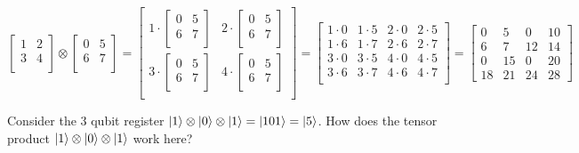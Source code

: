 \documentclass[11pt, oneside]{article}   	%
\begin{document}
\begin{equation*}
 \begin{bmatrix}
    1 & 2 \\
    3 & 4 \\
  \end{bmatrix}
\otimes
 \begin{bmatrix}
    0 & 5 \\
    6 & 7 \\
  \end{bmatrix} =
  \begin{bmatrix}
    1 \cdot \begin{bmatrix}
      0 & 5 \\
      6 & 7 \\
    \end{bmatrix} & 
    2 \cdot \begin{bmatrix}
      0 & 5 \\
      6 & 7 \\
    \end{bmatrix} \\

    3 \cdot \begin{bmatrix}
      0 & 5 \\
      6 & 7 \\
    \end{bmatrix} & 
    4 \cdot \begin{bmatrix}
      0 & 5 \\
      6 & 7 \\
    \end{bmatrix} \\
  \end{bmatrix} =
  \begin{bmatrix}
    1\cdot 0 & 1\cdot 5 & 2\cdot 0 & 2\cdot 5 \\
    1\cdot 6 & 1\cdot 7 & 2\cdot 6 & 2\cdot 7 \\
    3\cdot 0 & 3\cdot 5 & 4\cdot 0 & 4\cdot 5 \\
    3\cdot 6 & 3\cdot 7 & 4\cdot 6 & 4\cdot 7 \\
  \end{bmatrix} =
  \begin{bmatrix}
    0 & 5 & 0 & 10 \\
    6 & 7 & 12 & 14 \\
    0 & 15 & 0 & 20 \\
    18 & 21 & 24 & 28
  \end{bmatrix}
 \end{equation*}

\bigskip
\noindent
Consider the 3 qubit register $\ket{1} \otimes \ket{0} \otimes \ket{1} = \ket{101} = \ket{5}$. How does the tensor product 
$\ket{1} \otimes \ket{0} \otimes \ket{1}$ work here?
\end{document}
